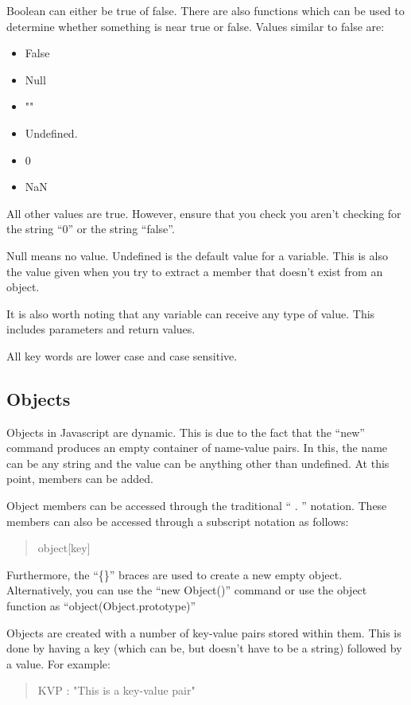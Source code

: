 			Boolean can either be true of false. 
			There are also functions which can be used to determine whether something is near true or false. 
			Values similar to false are:
			\begin{itemize}
				\item False
				\item Null
				\item ""
				\item Undefined. 
				\item 0
				\item NaN
			\end{itemize}
			All other values are true. 
			However, ensure that you check you aren't checking for the string ``0'' or the string ``false''. 

			Null means no value. 
			Undefined is the default value for a variable. 
			This is also the value given when you try to extract a member that doesn't exist from an object. 
			
			It is also worth noting that any variable can receive any type of value. 
			This includes parameters and return values. 
			
			All key words are lower case and case sensitive. 
		\subsection{Objects}
			Objects in Javascript are dynamic. 
			This is due to the fact that the ``new'' command produces an empty container of name-value pairs.
			In this, the name can be any string and the value can be anything other than undefined. 
			At this point, members can be added. 
			
			Object members can be accessed through the traditional `` . '' notation. 
			These members can also be accessed through a subscript notation as follows:
			\begin{quote}
				object[key]
			\end{quote}
			Furthermore, the ``\{\}'' braces are used to create a new empty object. 
			Alternatively, you can use the ``new Object()'' command or 
			use the object function as ``object(Object.prototype)''

			Objects are created with a number of key-value pairs stored within them. 
			This is done by having a key (which can be, but doesn't have to be a string) followed by a value. 
			For example:
			\begin{quote}
				KVP : "This is a key-value pair"
			\end{quote}
			 
